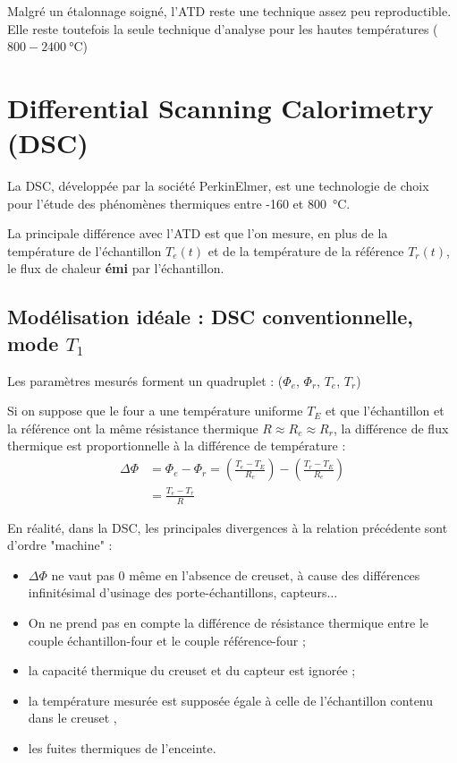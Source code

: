 \documentclass[a4paper]{book}
\begin{document}

Malgré un étalonnage soigné, l'ATD reste une technique assez peu reproductible. Elle reste toutefois la seule technique d'analyse pour les hautes températures ($800-2400 ~ \si{\celsius}$)

\section{Differential Scanning Calorimetry (DSC)}
La DSC, développée par la société PerkinElmer, est une technologie de choix pour l'étude des phénomènes thermiques entre -160 et \SI{800}{\celsius}.

La principale différence avec l'ATD est que l'on mesure, en plus de la température de l'échantillon $T_e (t)$ et de la température de la référence $T_r (t)$, le flux de chaleur \textbf{émi} par l'échantillon.

\subsection{Modélisation idéale : DSC conventionnelle, mode $T_1$}
Les paramètres mesurés forment un quadruplet : ($\Phi_e$, $\Phi_r$, $T_e$, $T_r$)

Si on suppose que le four a une température uniforme $T_E$ et que l'échantillon et la référence ont la même résistance thermique $R \approx R_e \approx R_r$, la différence de flux thermique est proportionnelle à la différence de température : 
\begin{align}
\Delta \Phi &= \Phi_e - \Phi_r = \left( \frac{T_e - T_E}{R_e}\right) - \left( \frac{T_r - T_E}{R_e}\right) \\
&= \frac{T_e - T_r}{R}
\end{align}


En réalité, dans la DSC, les principales divergences à la relation précédente sont d'ordre "machine" : 
\begin{itemize}
\item $\Delta \Phi$ ne vaut pas 0 même en l'absence de creuset, à cause des différences infinitésimal d'usinage des porte-échantillons, capteurs$\ldots$
\item On ne prend pas en compte la différence de résistance thermique entre le couple échantillon-four et le couple référence-four ;
\item la capacité thermique du creuset et du capteur est ignorée ;
\item la température mesurée est supposée égale à celle de l'échantillon contenu dans le creuset ,
\item les fuites thermiques de l'enceinte.
\end{itemize}
\end{document}
